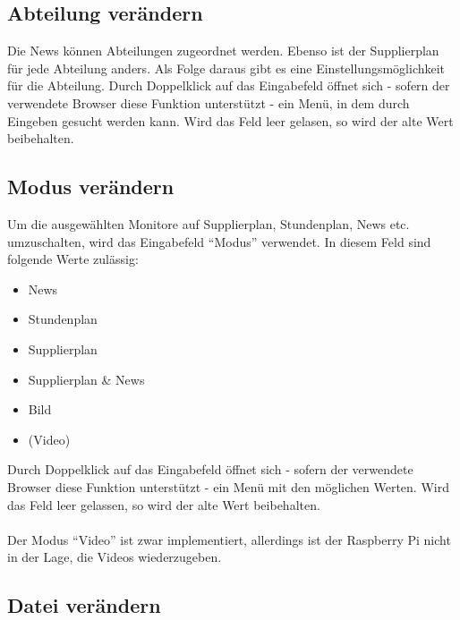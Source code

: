 \subsection{Abteilung verändern}

Die News können Abteilungen zugeordnet werden. Ebenso ist der Supplierplan für jede Abteilung anders. Als Folge daraus gibt es eine Einstellungsmöglichkeit für die Abteilung. Durch Doppelklick auf das Eingabefeld öffnet sich - sofern der verwendete Browser diese Funktion unterstützt - ein Menü, in dem durch Eingeben gesucht werden kann. Wird das Feld leer gelasen, so wird der alte Wert beibehalten.

\subsection{Modus verändern}

Um die ausgewählten Monitore auf Supplierplan, Stundenplan, News etc. umzuschalten, wird das Eingabefeld \enquote{Modus} verwendet. In diesem Feld sind folgende Werte zulässig:
\begin{itemize}
	\item News
	\item Stundenplan
	\item Supplierplan
	\item Supplierplan \& News
	\item Bild
	\item (Video)
\end{itemize}
Durch Doppelklick auf das Eingabefeld öffnet sich - sofern der verwendete Browser diese Funktion unterstützt - ein Menü mit den möglichen Werten. Wird das Feld leer gelassen, so wird der alte Wert beibehalten.\\
\\
Der Modus \enquote{Video} ist zwar implementiert, allerdings ist der Raspberry Pi nicht in der Lage, die Videos wiederzugeben.\\

\subsection{Datei verändern}

